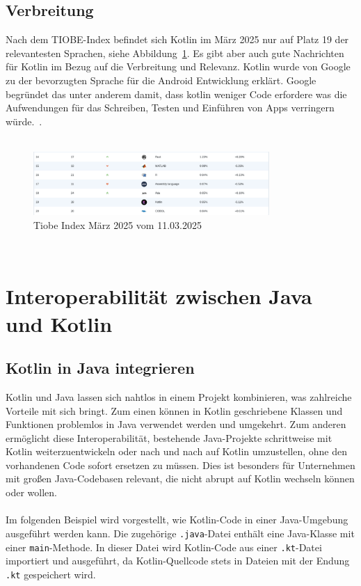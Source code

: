 \documentclass[11pt]{article}
\begin{document}
    \subsection{Verbreitung}
    Nach dem TIOBE-Index befindet sich Kotlin im März 2025 nur auf Platz 19 der relevantesten Sprachen, siehe Abbildung~\ref{fig:tiobe-kotlin-2025}.
    Es gibt aber auch gute Nachrichten für Kotlin im Bezug auf die Verbreitung und Relevanz.
    Kotlin wurde von Google zu der bevorzugten Sprache für die Android Entwicklung erklärt.
    Google begründet das unter anderem damit, dass kotlin weniger Code erfordere was die Aufwendungen für das Schreiben, Testen und Einführen von Apps verringern würde.~\cite{tn3-google}.\\
    \\
    \begin{figure}[h]
        \centering
        \includegraphics[width=0.8\textwidth]{pictures/Screenshot 2025-03-11 at 22-21-04 TIOBE Index - TIOBE}
        \caption{Tiobe Index März 2025 vom 11.03.2025}
        \label{fig:tiobe-kotlin-2025}
    \end{figure}
    \\
    \section{Interoperabilität zwischen Java und Kotlin}

    \subsection{Kotlin in Java integrieren}
    Kotlin und Java lassen sich nahtlos in einem Projekt kombinieren, was zahlreiche Vorteile mit sich bringt.
    Zum einen können in Kotlin geschriebene Klassen und Funktionen problemlos in Java verwendet werden und umgekehrt.
    Zum anderen ermöglicht diese Interoperabilität, bestehende Java-Projekte schrittweise mit Kotlin weiterzuentwickeln oder nach und nach auf Kotlin umzustellen, ohne den vorhandenen Code sofort ersetzen zu müssen.
    Dies ist besonders für Unternehmen mit großen Java-Codebasen relevant, die nicht abrupt auf Kotlin wechseln können oder wollen.~\cite[20]{kotlin-handbuch}\\
    \\
    Im folgenden Beispiel wird vorgestellt, wie Kotlin-Code in einer Java-Umgebung ausgeführt werden kann.
    Die zugehörige \texttt{.java}-Datei enthält eine Java-Klasse mit einer \texttt{main}-Methode.
    In dieser Datei wird Kotlin-Code aus einer \texttt{.kt}-Datei importiert und ausgeführt, da Kotlin-Quellcode stets
    in Dateien mit der Endung \texttt{.kt} gespeichert wird.\\
    \\
\end{document}

